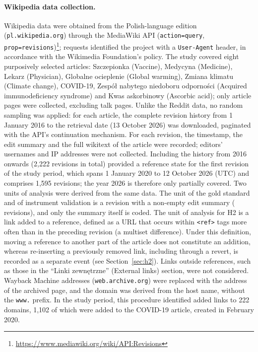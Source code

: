 \documentclass[10pt,a4paper]{article}
\newcommand{\kod}[1]{\texttt{#1}}
\begin{document}
\paragraph{Wikipedia data collection.}
Wikipedia data were obtained from the Polish-language edition (\kod{pl.wikipedia.org})
through the MediaWiki API (\kod{action=query},
\kod{prop=revisions})\footnote{\url{https://www.mediawiki.org/wiki/API:Revisions}};
requests identified the project with a \kod{User-Agent} header, in accordance with the
Wikimedia Foundation's policy. The study covered eight purposively selected articles:
Szczepionka (Vaccine), Medycyna (Medicine), Lekarz (Physician), Globalne ocieplenie
(Global warming), Zmiana klimatu (Climate change), COVID-19, Zespół nabytego niedoboru
odporności (Acquired immunodeficiency syndrome) and Kwas askorbinowy (Ascorbic acid); only
article pages were collected, excluding talk pages.
Unlike the Reddit data, no random sampling was applied: for each article, the complete
revision history from 1 January 2016 to the retrieval date (13 October 2026) was
downloaded, paginated with the API's continuation mechanism. For each revision, the
timestamp, the edit summary and the full wikitext of the article were recorded; editors'
usernames and IP addresses were not collected. Including the history from 2016 onwards
(2,222 revisions in total) provided a reference state for the first revision of the study
period, which spans 1 January 2020 to 12 October 2026 (UTC) and comprises 1,595
revisions; the year 2026 is therefore only partially covered. Two units of analysis were
derived from the same data. The unit of the gold standard and of instrument validation is
a revision with a non-empty edit summary (\resWikipediaFrame{} revisions), and only the
summary itself is coded. The unit of analysis for H2 is a link added to a reference,
defined as a URL that occurs within \kod{<ref>} tags more often than in the preceding
revision (a multiset difference). Under this definition, moving a reference to another
part of the article does not constitute an addition, whereas re-inserting a previously
removed link, including through a revert, is recorded as a separate event (see
Section~\ref{sec:h2}). Links outside references, such as those in the ``Linki
zewnętrzne'' (External links) section, were not considered. Wayback Machine addresses
(\kod{web.archive.org}) were replaced with the address of the archived page, and the
domain was derived from the host name, without the \kod{www.} prefix. In the study
period, this procedure identified \resHtwoLinks{} added links to 222 domains, 1,102 of
which were added to the COVID-19 article, created in February 2020.
\end{document}
